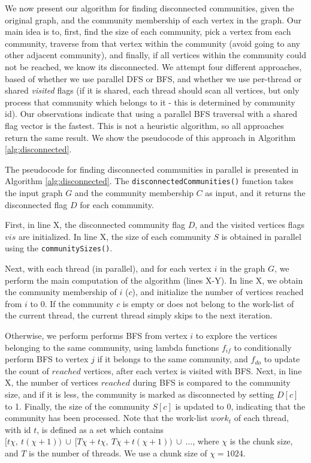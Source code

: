 We now present our algorithm for finding disconnected communities, given the original graph, and the community membership of each vertex in the graph. Our main idea is to, first, find the size of each community, pick a vertex from each community, traverse from that vertex within the community (avoid going to any other adjacent community), and finally, if all vertices within the community could not be reached, we know its disconnected. We attempt four different approaches, based of whether we use parallel DFS or BFS, and whether we use per-thread or shared \textit{visited} flags (if it is shared, each thread should scan all vertices, but only process that community which belongs to it - this is determined by community id). Our observations indicate that using a parallel BFS traversal with a shared flag vector is the fastest. This is not a heuristic algorithm, so all approaches return the same result. We show the pseudocode of this approach in Algorithm \ref{alg:disconnected}.




The pseudocode for finding disconnected communities in parallel is presented in Algorithm \ref{alg:disconnected}. The \texttt{disconnectedCommunities()} function takes the input graph $G$ and the community membership $C$ as input, and it returns the disconnected flag $D$ for each community.

First, in line X, the disconnected community flag $D$, and the visited vertices flags $vis$ are initialized. In line X, the size of each community $S$ is obtained in parallel using the \texttt{communitySizes()}.

Next, with each thread (in parallel), and for each vertex $i$ in the graph $G$, we perform the main computation of the algorithm (lines X-Y). In line X, we obtain the community membership of $i$ ($c$), and initialize the number of vertices reached from $i$ to $0$. If the community $c$ is empty or does not belong to the work-list of the current thread, the current thread simply skips to the next iteration.

Otherwise, we perform performs BFS from vertex $i$ to explore the vertices belonging to the same community, using lambda functions $f_{if}$ to conditionally perform BFS to vertex $j$ if it belongs to the same community, and $f_{do}$ to update the count of $reached$ vertices, after each vertex is visited with BFS. Next, in line X, the number of vertices $reached$ during BFS is compared to the community size, and if it is less, the community is marked as disconnected by setting $D[c]$ to 1. Finally, the size of the community $S[c]$ is updated to 0, indicating that the community has been processed. Note that the work-list $work_t$ of each thread, with id $t$, is defined as a set which contains $[t\chi,\ t(\chi+1))\ \cup\ [T\chi + t\chi,\ T\chi + t(\chi+1))\ \cup\ \ldots$, where $\chi$ is the chunk size, and $T$ is the number of threads. We use a chunk size of $\chi = 1024$.
